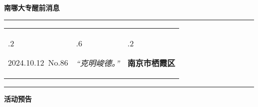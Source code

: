\documentclass[letterpaper, 12pt]{article}
\begin{document}
\begin{center}
    \Huge\textbf{南哪大专醒前消息}
\end{center}
\vspace{4mm}
\hrule
\renewcommand\tabularxcolumn[1]{m{#1}}
\begin{tabularx}{\textwidth}{>{\hsize.2\hsize}X>{\hsize.6\hsize}X>{\hsize.2\hsize}X}
    \begin{flushleft}
        2024.10.12\, No.86
    \end{flushleft}
    &
    \begin{center}
        \textit{“克明峻德。”}
    \end{center}
    &
    \begin{flushright}
        \textbf{南京市栖霞区}
    \end{flushright}
\end{tabularx}
\vspace{-3.5mm}
\hrule
\vspace{4mm}
\centerline{\huge\textbf{活动预告}}
\end{document}
